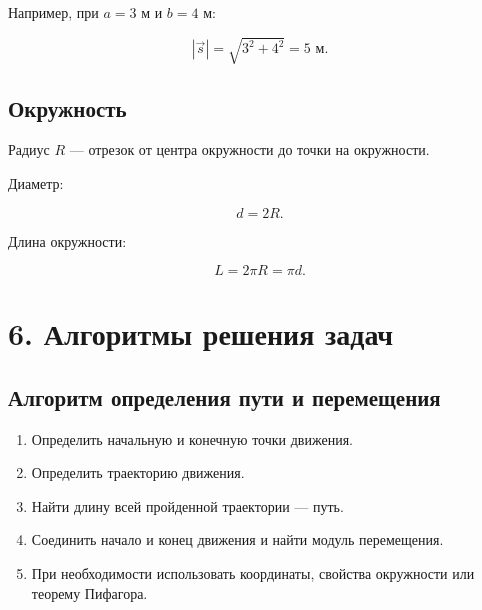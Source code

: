 \documentclass[a4paper,12pt]{article}
\begin{document}
Например, при $a=3$ м и $b=4$ м:

\[
|\vec{s}|=\sqrt{3^2+4^2}=5\text{ м}.
\]

\subsection*{Окружность}

Радиус $R$ --- отрезок от центра окружности
до точки на окружности.

Диаметр:

\[
d=2R.
\]

Длина окружности:

\[
L=2\pi R=\pi d.
\]

\begin{center}
\end{center}


\section*{6. Алгоритмы решения задач}

\subsection*{Алгоритм определения пути и перемещения}

\begin{enumerate}
    \item Определить начальную и конечную точки движения.
    \item Определить траекторию движения.
    \item Найти длину всей пройденной траектории --- путь.
    \item Соединить начало и конец движения и найти модуль перемещения.
    \item При необходимости использовать координаты,
    свойства окружности или теорему Пифагора.
\end{enumerate}
\end{document}
